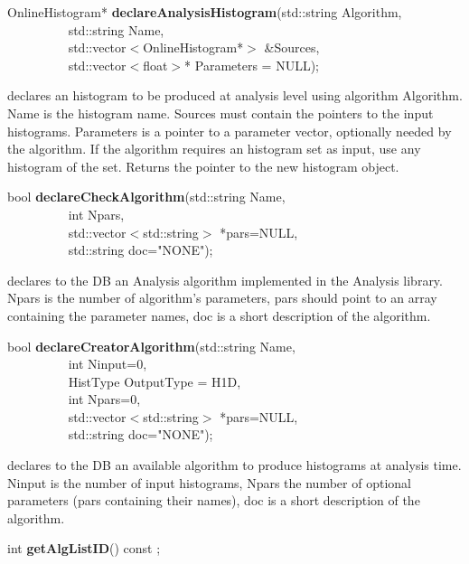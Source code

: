 \item    OnlineHistogram* {\bf declareAnalysisHistogram}(std::string Algorithm,\\\mbox{}~~~~~~~~~
					    std::string Name,\\\mbox{}~~~~~~~~~
					    std::vector$<$OnlineHistogram*$>$ \&Sources,\\\mbox{}~~~~~~~~~
					    std::vector$<$float$>$* Parameters = NULL);

 declares an histogram to be produced at analysis
 level using algorithm Algorithm. Name is the histogram name. Sources
 must contain the pointers to the input histograms. Parameters is a
 pointer to a parameter vector, optionally needed by the algorithm. If
 the algorithm requires an histogram set as input, use any histogram of the
 set. Returns the pointer to the new histogram object.


\item    bool {\bf declareCheckAlgorithm}(std::string Name,\\\mbox{}~~~~~~~~~ 
			     int Npars,\\\mbox{}~~~~~~~~~ 
			     std::vector$<$std::string$>$ *pars=NULL,\\\mbox{}~~~~~~~~~ 
			     std::string doc="NONE");

 declares to the DB an Analysis algorithm implemented in the Analysis
 library. Npars is the number of algorithm's parameters, pars should
 point to an array containing the parameter names, doc is a short
 description of the algorithm.


\item    bool {\bf declareCreatorAlgorithm}(std::string Name,\\\mbox{}~~~~~~~~~ 
			       int Ninput=0,\\\mbox{}~~~~~~~~~ 
			       HistType OutputType = H1D,\\\mbox{}~~~~~~~~~
			       int Npars=0,\\\mbox{}~~~~~~~~~ 
			       std::vector$<$std::string$>$ *pars=NULL,\\\mbox{}~~~~~~~~~
			       std::string doc="NONE");

 declares to the DB an available algorithm to produce histograms at
 analysis time. Ninput is the number of input histograms, Npars the
 number of optional parameters (pars containing their names), doc is a short
 description of the algorithm.


\item    int {\bf getAlgListID}() const ;

